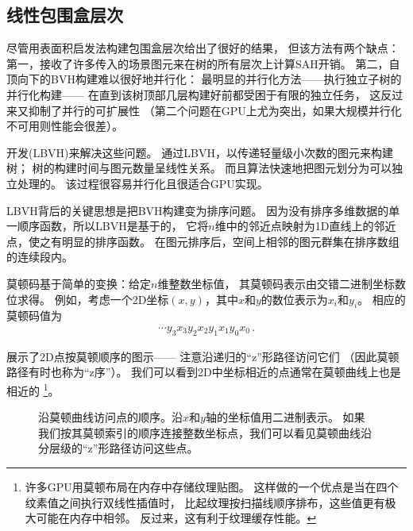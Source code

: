 \subsection{线性包围盒层次}\label{sub:线性包围盒层次}
尽管用表面积启发法构建包围盒层次给出了很好的结果，
但该方法有两个缺点：第一，接收了许多传入的场景图元来在树的所有层次上计算SAH开销。
第二，自顶向下的BVH构建难以很好地并行化：
最明显的并行化方法——执行独立子树的并行化构建——
在直到该树顶部几层构建好前都受困于有限的独立任务，
这反过来又抑制了并行的可扩展性
（第二个问题在GPU上尤为突出，如果大规模并行化不可用则性能会很差）。

开发(LBVH)来解决这些问题。
通过LBVH，以传递轻量级小次数的图元来构建树；
树的构建时间与图元数量呈线性关系。
而且算法快速地把图元划分为可以独立处理的。
该过程很容易并行化且很适合GPU实现。

LBVH背后的关键思想是把BVH构建变为排序问题。
因为没有排序多维数据的单一顺序函数，所以LBVH是基于的，
它将$n$维中的邻近点映射为1D直线上的邻近点，使之有明显的排序函数。
在图元排序后，空间上相邻的图元群集在排序数组的连续段内。

莫顿码基于简单的变换：给定$n$维整数坐标值，
其莫顿码表示由交错二进制坐标数位求得。
例如，考虑一个2D坐标$(x,y)$，其中$x$和$y$的数位表示为$x_i$和$y_i$。
相应的莫顿码值为
\begin{align*}
    \cdots y_3x_3y_2x_2y_1x_1y_0x_0\, .
\end{align*}

展示了2D点按莫顿顺序的图示——
注意沿递归的“z”形路径访问它们
（因此莫顿路径有时也称为“z序”）。
我们可以看到2D中坐标相近的点通常在莫顿曲线上也是相近的
\footnote{许多GPU用莫顿布局在内存中存储纹理贴图。
    这样做的一个优点是当在四个纹素值之间执行双线性插值时，
    比起纹理按扫描线顺序排布，这些值更有极大可能在内存中相邻。
    反过来，这有利于纹理缓存性能。}。
\begin{figure}[htbp]
    \centering
    \caption{沿莫顿曲线访问点的顺序。沿$x$和$y$轴的坐标值用二进制表示。
        如果我们按其莫顿索引的顺序连接整数坐标点，我们可以看见莫顿曲线沿分层级的“z”形路径访问这些点。}
    \label{fig:4.7}
\end{figure}

